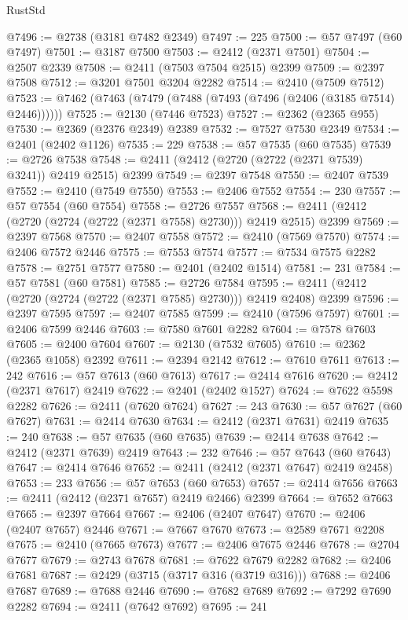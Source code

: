 \begin{lexlean}{RustStd}
\begin{coremodule}
@7496 := @2738 (@3181 @7482 @2349)
@7497 := 225
@7500 := @57 @7497 (@60 @7497)
@7501 := @3187 @7500
@7503 := @2412 (@2371 @7501)
@7504 := @2507 @2339
@7508 := @2411 (@7503 @7504 @2515) @2399
@7509 := @2397 @7508
@7512 := @3201 @7501 @3204 @2282
@7514 := @2410 (@7509 @7512)
@7523 := @7462 (@7463 (@7479 (@7488 (@7493 (@7496 (@2406 (@3185 @7514) @2446))))))
@7525 := @2130 (@7446 @7523)
@7527 := @2362 (@2365 @955)
@7530 := @2369 (@2376 @2349) @2389
@7532 := @7527 @7530 @2349
@7534 := @2401 (@2402 @1126)
@7535 := 229
@7538 := @57 @7535 (@60 @7535)
@7539 := @2726 @7538
@7548 := @2411 (@2412 (@2720 (@2722 (@2371 @7539) @3241)) @2419 @2515) @2399
@7549 := @2397 @7548
@7550 := @2407 @7539
@7552 := @2410 (@7549 @7550)
@7553 := @2406 @7552
@7554 := 230
@7557 := @57 @7554 (@60 @7554)
@7558 := @2726 @7557
@7568 := @2411 (@2412 (@2720 (@2724 (@2722 (@2371 @7558) @2730))) @2419 @2515) @2399
@7569 := @2397 @7568
@7570 := @2407 @7558
@7572 := @2410 (@7569 @7570)
@7574 := @2406 @7572 @2446
@7575 := @7553 @7574
@7577 := @7534 @7575 @2282
@7578 := @2751 @7577
@7580 := @2401 (@2402 @1514)
@7581 := 231
@7584 := @57 @7581 (@60 @7581)
@7585 := @2726 @7584
@7595 := @2411 (@2412 (@2720 (@2724 (@2722 (@2371 @7585) @2730))) @2419 @2408) @2399
@7596 := @2397 @7595
@7597 := @2407 @7585
@7599 := @2410 (@7596 @7597)
@7601 := @2406 @7599 @2446
@7603 := @7580 @7601 @2282
@7604 := @7578 @7603
@7605 := @2400 @7604
@7607 := @2130 (@7532 @7605)
@7610 := @2362 (@2365 @1058) @2392
@7611 := @2394 @2142
@7612 := @7610 @7611
@7613 := 242
@7616 := @57 @7613 (@60 @7613)
@7617 := @2414 @7616
@7620 := @2412 (@2371 @7617) @2419
@7622 := @2401 (@2402 @1527)
@7624 := @7622 @5598 @2282
@7626 := @2411 (@7620 @7624)
@7627 := 243
@7630 := @57 @7627 (@60 @7627)
@7631 := @2414 @7630
@7634 := @2412 (@2371 @7631) @2419
@7635 := 240
@7638 := @57 @7635 (@60 @7635)
@7639 := @2414 @7638
@7642 := @2412 (@2371 @7639) @2419
@7643 := 232
@7646 := @57 @7643 (@60 @7643)
@7647 := @2414 @7646
@7652 := @2411 (@2412 (@2371 @7647) @2419 @2458)
@7653 := 233
@7656 := @57 @7653 (@60 @7653)
@7657 := @2414 @7656
@7663 := @2411 (@2412 (@2371 @7657) @2419 @2466) @2399
@7664 := @7652 @7663
@7665 := @2397 @7664
@7667 := @2406 (@2407 @7647)
@7670 := @2406 (@2407 @7657) @2446
@7671 := @7667 @7670
@7673 := @2589 @7671 @2208
@7675 := @2410 (@7665 @7673)
@7677 := @2406 @7675 @2446
@7678 := @2704 @7677
@7679 := @2743 @7678
@7681 := @7622 @7679 @2282
@7682 := @2406 @7681
@7687 := @2429 (@3715 (@3717 @316 (@3719 @316)))
@7688 := @2406 @7687
@7689 := @7688 @2446
@7690 := @7682 @7689
@7692 := @7292 @7690 @2282
@7694 := @2411 (@7642 @7692)
@7695 := 241

\end{coremodule}
\end{lexlean}
